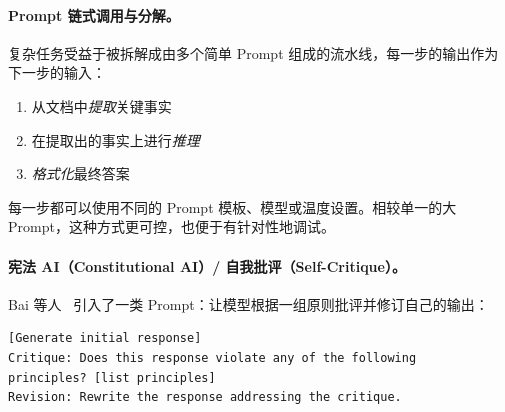 \paragraph{Prompt 链式调用与分解。}
\label{prompt-chaining-and-decomposition.}

复杂任务受益于被拆解成由多个简单 Prompt 组成的流水线，每一步的输出作为下一步的输入：

\begin{enumerate}
  \item 从文档中\emph{提取}关键事实
  \item 在提取出的事实上进行\emph{推理}
  \item \emph{格式化}最终答案
\end{enumerate}

每一步都可以使用不同的 Prompt 模板、模型或温度设置。相较单一的大 Prompt，这种方式更可控，也便于有针对性地调试。

\paragraph{宪法 AI（Constitutional AI）/ 自我批评（Self-Critique）。}
\label{constitutional-ai-self-critique.}

Bai 等人~\cite{bai2022constitutional} 引入了一类 Prompt：让模型根据一组原则批评并修订自己的输出：

\begin{lstlisting}
[Generate initial response]
Critique: Does this response violate any of the following
principles? [list principles]
Revision: Rewrite the response addressing the critique.
\end{lstlisting}

